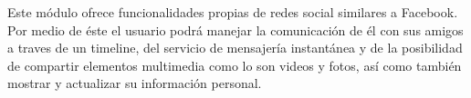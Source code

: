 Este módulo ofrece funcionalidades propias de redes social similares a Facebook. Por medio de éste el usuario podrá manejar la comunicación de él con sus amigos a traves de un timeline, del servicio de mensajería instantánea y de la posibilidad de compartir elementos multimedia como lo son videos y fotos, así como también mostrar y actualizar su información personal.